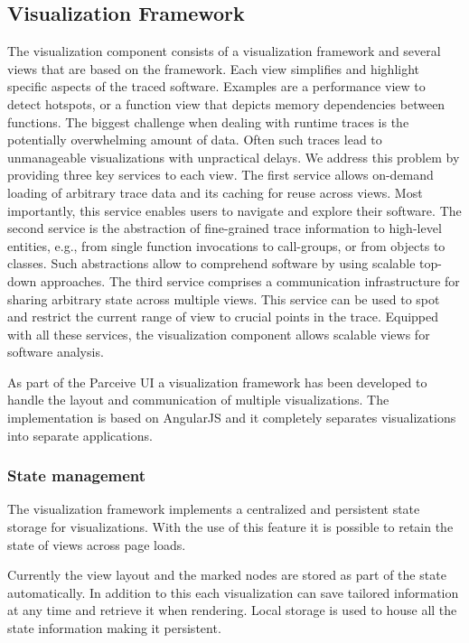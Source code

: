 \subsection{Visualization Framework}
The visualization component consists of a visualization framework and several
views that are based on the framework. Each view simplifies and highlight
specific aspects of the traced software. Examples are a performance view to
detect hotspots, or a function view that depicts memory dependencies between
functions. The biggest challenge when dealing with runtime traces is the
potentially
overwhelming amount of data. Often such traces lead to unmanageable
visualizations with unpractical delays. We address this problem by providing
three key services to each view. The first service allows on-demand loading of
arbitrary trace data and its caching for reuse across views. Most importantly,
this service enables users to navigate and explore their software. The second
service is the abstraction of fine-grained trace information to high-level
entities, e.g., from single function invocations to call-groups, or from
objects to classes. Such abstractions allow to comprehend software by using
scalable top-down approaches. The third service comprises a communication
infrastructure for sharing arbitrary state across multiple views. This service
can be used to spot and restrict the current range of view to crucial points in
the trace. Equipped with all these services, the visualization component allows
scalable views for software analysis.


As part of the Parceive UI a visualization framework has been developed to
handle the layout and communication of multiple visualizations. The
implementation is based on AngularJS and it completely separates visualizations
into separate applications.

\subsubsection{State management}

The visualization framework implements a centralized and persistent state
storage for visualizations. With the use of this feature it is possible to
retain the state of views across page loads.

Currently the view layout and the marked nodes are stored as part of the state
automatically. In addition to this each visualization can save tailored
information at any time and retrieve it when rendering. Local storage is used
to house all the state information making it persistent.

